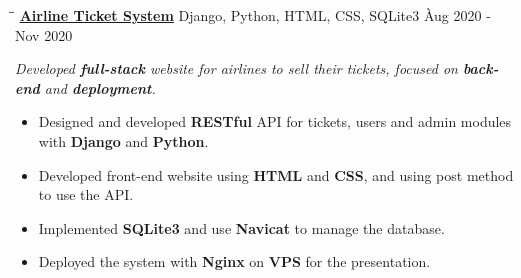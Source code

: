 \documentclass{res}
\begin{document}
\begin{resume}
    \vspace{-0.2in}	 
    \begin{tabbing}
    \hspace{2.391in}\= \hspace{3in}\= \kill %
    \href{https://github.com/DolorHunter/AirlineTicketSystem}{\bf Airline Ticket System}  \> 
                Django, Python, HTML, CSS, SQLite3 \` Aug 2020 - Nov 2020 \\
    \end{tabbing}\vspace{-20pt}      %
    \vspace{-0.13in}
    \textit{Developed {\bf full-stack} website for airlines to sell their tickets, 
                focused on {\bf back-end} and {\bf deployment}.}
    \vspace{+0.05in}
    \begin{itemize} \itemsep 0.5pt %
        \item Designed and developed {\bf RESTful} API for tickets, users and admin modules with 
                {\bf Django} and {\bf Python}.
        \item Developed front-end website using {\bf HTML} and {\bf CSS}, and using post method 
                to use the API.
        \item Implemented {\bf SQLite3} and use {\bf Navicat} to manage the database.
        \item Deployed the system with {\bf Nginx} on {\bf VPS} for the presentation.
    \end{itemize}


\end{resume}
\end{document}
